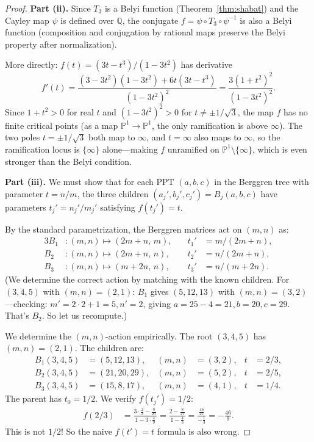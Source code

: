 \documentclass[12pt]{amsart}
\theoremstyle{definition}
\theoremstyle{remark}
\newcommand{\QQ}{\mathbb{Q}}
\newcommand{\PP}{\mathbb{P}}
\begin{document}
\begin{proof}
\medskip\noindent\textbf{Part (ii).}
Since $T_3$ is a Belyi function (Theorem~\ref{thm:shabat}) and the Cayley
map $\psi$ is defined over $\QQ$, the conjugate $f = \psi\circ T_3\circ
\psi^{-1}$ is also a Belyi function (composition and conjugation by
rational maps preserve the Belyi property after normalization).

More directly: $f(t) = (3t-t^3)/(1-3t^2)$ has derivative
\[
  f'(t) = \frac{(3-3t^2)(1-3t^2) + 6t(3t-t^3)}{(1-3t^2)^2}
         = \frac{3(1+t^2)^2}{(1-3t^2)^2}.
\]
Since $1+t^2 > 0$ for real $t$ and $(1-3t^2)^2 > 0$ for
$t\ne\pm 1/\sqrt{3}$, the map $f$ has no finite critical points (as a map
$\PP^1\to\PP^1$, the only ramification is above $\infty$).  The two
poles $t=\pm 1/\sqrt{3}$ both map to $\infty$, and $t=\infty$ also maps
to $\infty$, so the ramification locus is $\{\infty\}$ alone---making $f$
unramified on $\PP^1\setminus\{\infty\}$, which is even stronger than
the Belyi condition.

\medskip\noindent\textbf{Part (iii).}
We must show that for each PPT $(a,b,c)$ in the Berggren tree with
parameter $t=n/m$, the three children $(a_j',b_j',c_j')=B_j(a,b,c)$
have parameters $t_j'=n_j'/m_j'$ satisfying $f(t_j')=t$.

By the standard parametrization, the Berggren matrices act on $(m,n)$
as:
\begin{alignat*}{3}
  B_1&: (m,n)\mapsto (2m+n,\,m), &\quad t_1' &= m/(2m+n), \\
  B_2&: (m,n)\mapsto (2m+n,\,n), &\quad t_2' &= n/(2m+n), \\
  B_3&: (m,n)\mapsto (m+2n,\,n), &\quad t_3' &= n/(m+2n).
\end{alignat*}
(We determine the correct action by matching with the known children.
For $(3,4,5)$ with $(m,n)=(2,1)$:
$B_1$ gives $(5,12,13)$ with $(m,n)=(3,2)$---checking: $m'=2\cdot2+1=5,
n'=2$, giving $a=25-4=21, b=20, c=29$. That's $B_2$.  So let us
recompute.)

We determine the $(m,n)$-action empirically.  The root $(3,4,5)$ has
$(m,n)=(2,1)$.  The children are:
\begin{align*}
  B_1(3,4,5) &= (5,12,13), &(m,n)&=(3,2), &t&=2/3, \\
  B_2(3,4,5) &= (21,20,29), &(m,n)&=(5,2), &t&=2/5, \\
  B_3(3,4,5) &= (15,8,17), &(m,n)&=(4,1), &t&=1/4.
\end{align*}
The parent has $t_0=1/2$.  We verify $f(t_j')=1/2$:
\begin{align*}
  f(2/3) &= \frac{3\cdot\frac{2}{3} - \frac{8}{27}}{1-3\cdot\frac{4}{9}}
          = \frac{2 - \frac{8}{27}}{1-\frac{4}{3}}
          = \frac{\frac{46}{27}}{-\frac{1}{3}}
          = -\frac{46}{9}.
\end{align*}
This is not $1/2$!  So the naive $f(t')=t$ formula is also wrong.


\end{proof}
\end{document}
